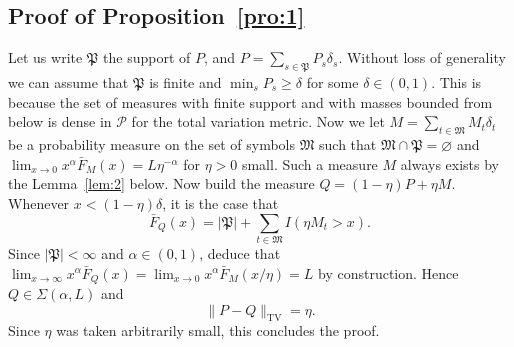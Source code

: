 \documentclass{article}
\newcommand{\1}{\boldsymbol{1}}
\theoremstyle{plain}
\begin{document}
\subsection{Proof of Proposition~\ref{pro:1}}
\label{sec:proof-prop-refpr-1}


Let us write $\mathfrak{P}$ the support of $P$, and $P = \sum_{s \in \mathfrak{P}}P_s\delta_s$. Without loss of generality we can assume that $\mathfrak{P}$ is finite and $\min_sP_s \geq \delta$ for some $\delta \in (0,1)$. This is because the set of measures with finite support and with masses bounded from below is dense in $\mathcal{P}$ for the total variation metric. Now we let $M = \sum_{t\in \mathfrak{M}}M_t\delta_t$ be a probability measure on the set of symbols $\mathfrak{M}$ such that $\mathfrak{M} \cap \mathfrak{P} = \varnothing$ and $\lim_{x\to 0}x^{\alpha}\bar{F}_M(x) = L \eta^{-\alpha}$ for $\eta>0$ small. Such a measure $M$ always exists by the Lemma~\ref{lem:2} below. Now build the measure $Q = (1-\eta)P + \eta M$. Whenever $x < (1-\eta)\delta$, it is the case that
\begin{equation*}
  \bar{F}_Q(x)%
  =
  |\mathfrak{P}| +  \sum_{t\in \mathfrak{M}}I(\eta M_t > x).
\end{equation*}
Since $|\mathfrak{P}| < \infty$ and $\alpha \in (0,1)$, deduce that $\lim_{x\to \infty}x^{\alpha}\bar{F}_Q(x) = \lim_{x \to 0}x^{\alpha}\bar{F}_M(x/\eta) = L$ by construction. Hence $Q\in \Sigma(\alpha,L)$ and
\begin{equation*}
  \|P - Q\|_{\mathrm{TV}}%
  = \eta.
\end{equation*}
Since $\eta$ was taken arbitrarily small, this concludes the proof.
\end{document}
